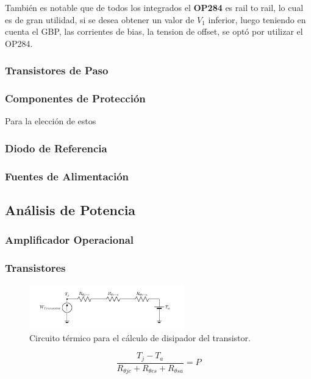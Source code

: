 También es notable que de todos los integrados el \textbf{OP284} es rail to rail, lo cual es de gran utilidad, si se desea obtener un valor de $V_1$ inferior, luego teniendo en cuenta el GBP, las corrientes de bias, la tension de offset, se optó por utilizar el OP284.
\subsubsection{Transistores de Paso}
\subsubsection{Componentes de Protección}
Para la elección de estos 
\subsubsection{Diodo de Referencia}
\subsubsection{Fuentes de Alimentación}

\subsection{Análisis de Potencia}
\subsubsection{Amplificador Operacional}
\subsubsection{Transistores}

\begin{figure}[H]
\centering
	\includegraphics[width=0.6\textwidth, page=1]{ImagenesEjercicio2/Potencia - Transistor.pdf}
	\caption{Circuito térmico para el cálculo de disipador del transistor.}
	\label{fig:circuitopottrans}
\end{figure}

\begin{equation}
\frac{T_j - T_a}{R_{\theta jc}+R_{\theta cs}+R_{\theta sa}} = P
\end{equation}

